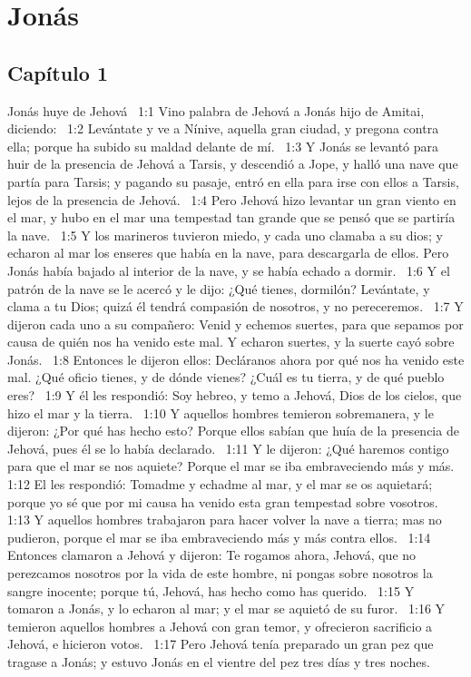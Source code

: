 \chapter{Jonás}
\section*{Capítulo 1 }
Jonás huye de Jehová  
1:1 Vino palabra de Jehová a Jonás hijo de Amitai, diciendo:  
1:2 Levántate y ve a Nínive, aquella gran ciudad, y pregona contra ella; porque ha subido su maldad delante de mí.  
1:3 Y Jonás se levantó para huir de la presencia de Jehová a Tarsis, y descendió a Jope, y halló una nave que partía para Tarsis; y pagando su pasaje, entró en ella para irse con ellos a Tarsis, lejos de la presencia de Jehová.  
1:4 Pero Jehová hizo levantar un gran viento en el mar, y hubo en el mar una tempestad tan grande que se pensó que se partiría la nave.  
1:5 Y los marineros tuvieron miedo, y cada uno clamaba a su dios; y echaron al mar los enseres que había en la nave, para descargarla de ellos. Pero Jonás había bajado al interior de la nave, y se había echado a dormir.  
1:6 Y el patrón de la nave se le acercó y le dijo: ¿Qué tienes, dormilón? Levántate, y clama a tu Dios; quizá él tendrá compasión de nosotros, y no pereceremos.  
1:7 Y dijeron cada uno a su compañero: Venid y echemos suertes, para que sepamos por causa de quién nos ha venido este mal. Y echaron suertes, y la suerte cayó sobre Jonás.  
1:8 Entonces le dijeron ellos: Decláranos ahora por qué nos ha venido este mal. ¿Qué oficio tienes, y de dónde vienes? ¿Cuál es tu tierra, y de qué pueblo eres?  
1:9 Y él les respondió: Soy hebreo, y temo a Jehová, Dios de los cielos, que hizo el mar y la tierra.  
1:10 Y aquellos hombres temieron sobremanera, y le dijeron: ¿Por qué has hecho esto? Porque ellos sabían que huía de la presencia de Jehová, pues él se lo había declarado.  
1:11 Y le dijeron: ¿Qué haremos contigo para que el mar se nos aquiete? Porque el mar se iba embraveciendo más y más.  
1:12 El les respondió: Tomadme y echadme al mar, y el mar se os aquietará; porque yo sé que por mi causa ha venido esta gran tempestad sobre vosotros. 
1:13 Y aquellos hombres trabajaron para hacer volver la nave a tierra; mas no pudieron, porque el mar se iba embraveciendo más y más contra ellos.  
1:14 Entonces clamaron a Jehová y dijeron: Te rogamos ahora, Jehová, que no perezcamos nosotros por la vida de este hombre, ni pongas sobre nosotros la sangre inocente; porque tú, Jehová, has hecho como has querido.  
1:15 Y tomaron a Jonás, y lo echaron al mar; y el mar se aquietó de su furor.  
1:16 Y temieron aquellos hombres a Jehová con gran temor, y ofrecieron sacrificio a Jehová, e hicieron votos.  
1:17 Pero Jehová tenía preparado un gran pez que tragase a Jonás; y estuvo Jonás en el vientre del pez tres días y tres noches. 
